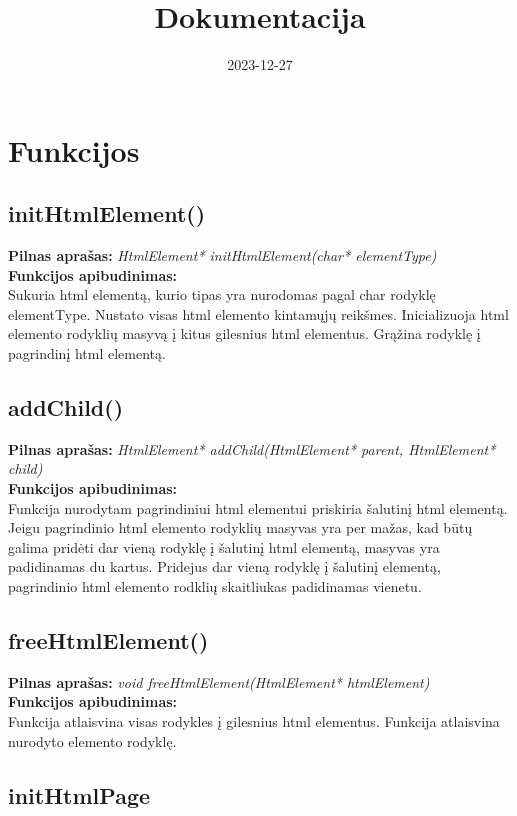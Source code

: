 \documentclass[a4paper,10pt]{article}
\title{Dokumentacija}
\author{}
\date{2023-12-27}
\begin{document}
\maketitle

\section{Funkcijos}
\subsection{initHtmlElement()}
\label{initHtmlElement}
\textbf{Pilnas aprašas:} \textit{HtmlElement* initHtmlElement(char* elementType)}
\\\textbf{Funkcijos apibudinimas:}
\\Sukuria html elementą, kurio tipas yra nurodomas pagal char rodyklę elementType. 
Nustato visas html elemento kintamųjų reikšmes. Inicializuoja html elemento rodyklių 
masyvą į kitus gilesnius html elementus. Grąžina rodyklę į pagrindinį html elementą.

\subsection{addChild()}
\label{addChild}
\textbf{Pilnas aprašas:} \textit{HtmlElement* addChild(HtmlElement* parent, HtmlElement* child)}
\\\textbf{Funkcijos apibudinimas:}
\\Funkcija nurodytam pagrindiniui html elementui priskiria šalutinį html elementą. Jeigu pagrindinio html elemento rodyklių masyvas
yra per mažas, kad būtų galima pridėti dar vieną rodyklę į šalutinį html elementą, masyvas yra padidinamas du kartus. Pridejus dar vieną
rodyklę į šalutinį elementą, pagrindinio html elemento rodklių skaitliukas padidinamas vienetu.

\subsection{freeHtmlElement()}
\label{freeHtmlElement}
\textbf{Pilnas aprašas:} \textit{void freeHtmlElement(HtmlElement* htmlElement)}
\\\textbf{Funkcijos apibudinimas:}
\\Funkcija atlaisvina visas rodykles į gilesnius html elementus. Funkcija atlaisvina nurodyto elemento rodyklę.

\subsection{initHtmlPage}
\end{document}

